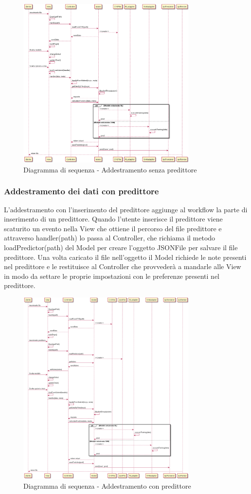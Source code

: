 \documentclass[../manuale-sviluppatore.tex]{subfiles}
\begin{document}
\begin{figure}[H]
    \begin{center}
         \includegraphics[width=9cm]{img/sequenceDiagramNoP.png}
         \caption{Diagramma di sequenza - Addestramento senza predittore}
         \label{fig:diagramma_di_sequenza}
     \end{center}
 \end{figure}

\subsubsection{Addestramento dei dati con predittore}
\label{ssec:addestramento_dati_con_predittore}
L'addestramento con l'inserimento del predittore aggiunge al workflow la parte di inserimento di un predittore.
Quando l'utente inserisce il predittore viene scaturito un evento nella View che ottiene il percorso del file predittore e attraverso handler(path) lo passa al Controller,
che richiama il metodo loadPredictor(path) del Model per creare l'oggetto JSONFile per salvare il file predittore.
Una volta caricato il file nell'oggetto il Model richiede le note presenti nel predittore e le restituisce al Controller che provvederà a mandarle alle View in modo da settare le proprie impostazioni con le preferenze presenti nel predittore.

\begin{figure}[H]
    \begin{center}
         \includegraphics[width=9cm]{img/sequenceDiagramConP.png}
         \caption{Diagramma di sequenza - Addestramento con predittore}
         \label{fig:daa}
     \end{center}
 \end{figure}
 
\end{document}

